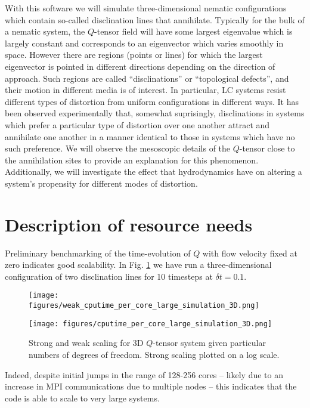 \documentclass[reqno]{article}
\begin{document}
With this software we will simulate three-dimensional nematic configurations which contain so-called disclination lines that annihilate.
Typically for the bulk of a nematic system, the $Q$-tensor field will have some largest eigenvalue which is largely constant and corresponds to an eigenvector which varies smoothly in space.
However there are regions (points or lines) for which the largest eigenvector is pointed in different directions depending on the direction of approach.
Such regions are called ``disclinations'' or ``topological defects'', and their motion in different media is of interest.
In particular, LC systems resist different types of distortion from uniform configurations in different ways.
It has been observed experimentally that, somewhat suprisingly, disclinations in systems which prefer a particular type of distortion over one another attract and annihilate one another in a manner identical to those in systems which have no such preference.
We will observe the mesoscopic details of the $Q$-tensor close to the annihilation sites to provide an explanation for this phenomenon.
Additionally, we will investigate the effect that hydrodynamics have on altering a system's propensity for different modes of distortion.

\section{Description of resource needs}
Preliminary benchmarking of the time-evolution of $Q$ with flow velocity fixed at zero indicates good scalability.
In Fig. \ref{fig:scaling-benchmarks} we have run a three-dimensional configuration of two disclination lines for 10 timesteps at $\delta t = 0.1$.
\begin{figure}[H] 
  \centering 
  \begin{minipage}{0.49\textwidth}
    \centering
    \texttt{[image: figures/weak\_cputime\_per\_core\_large\_simulation\_3D.png]}
  \end{minipage}
  \begin{minipage}{0.49\textwidth}
    \centering
    \texttt{[image: figures/cputime\_per\_core\_large\_simulation\_3D.png]}
  \end{minipage}
  \caption{Strong and weak scaling for 3D $Q$-tensor system given particular numbers of degrees of freedom. Strong scaling plotted on a log scale.}
    \label{fig:scaling-benchmarks}
\end{figure}
Indeed, despite initial jumps in the range of 128-256 cores -- likely due to an increase in MPI communications due to multiple nodes -- this indicates that the code is able to scale to very large systems.
\end{document}
